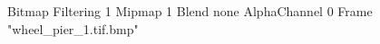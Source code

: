 {Bitmap
	{Filtering 1}
	{Mipmap 1}
	{Blend none}
	{AlphaChannel 0}
	{Frame "wheel_pier_1.tif.bmp"}
}
